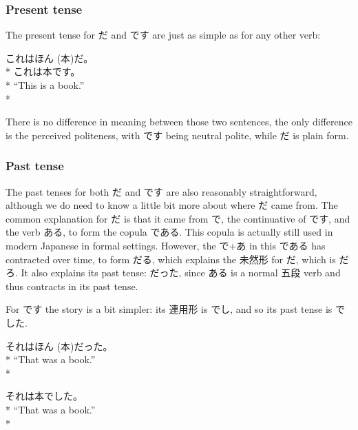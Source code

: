 \documentclass[11pt, b5paper, twoside, openright, onecolumn]{book}
\makeatletter
\newcommand*{\rubystack}[2]{{\relscale{0.5}%
  \begin{tabular}[b]{@{}c@{}}%
    {#1}\\%
   {\textscale{2}{#2}}%
  \end{tabular}}%
}
\DeclareRobustCommand*{\ruby}[2]{%
  \mbox{%
    \setlength{\parskip}{0ex}%
    \BeginAccSupp{method=pdfstringdef,ActualText={#1}}%
      \rubystack{\phantom{#2}}{#1}%
      \llap{%
        \rubystack{#2}{\phantom{#1}}%
      }%
    \EndAccSupp{}%
  }%
}
\renewcommand*{\ruby}[2]{#2 (#1)}%
\newenvironment{exampleblock}{
\setlength{\parindent}{0.6in}
\begin{minipage}[t]{\dimexpr\textwidth-\parindent}}
{\end{minipage}}
\makeatother
\begin{document}
\subsubsection{Present tense}

The present tense for だ and です are just as simple as for any other verb:

\vspace{0.4cm}
\begin{exampleblock}
これは\ruby{本}{ほん}だ。 \\* 
これは本です。 \\* 
“This is a book.” \\* 
\end{exampleblock}
\vspace{0.2cm}

There is no difference in meaning between those two sentences‚ the only difference is the perceived politeness‚ with です being neutral polite‚ while だ is plain form.

\subsubsection{Past tense}

The past tenses for both だ and です are also reasonably straightforward‚ although we do need to know a little bit more about where だ came from. The common explanation for だ is that it came from で‚ the continuative of です‚ and the verb ある‚ to form the copula である. This copula is actually still used in modern Japanese in formal settings. However‚ the で+あ in this である has contracted over time‚ to form だる‚ which explains the 未然形 for だ‚ which is だろ. It also explains its past tense: だった‚ since ある is a normal 五段 verb and thus contracts in its past tense.

For です the story is a bit simpler: its 連用形 is でし‚ and so its past tense is でした.

\vspace{0.4cm}
\begin{exampleblock}
それは\ruby{本}{ほん}だった。 \\* 
“That was a book.” \\* 
\end{exampleblock}
\vspace{0.2cm}

\begin{exampleblock}
それは本でした。 \\* 
“That was a book.” \\* 
\end{exampleblock}
\vspace{0.2cm}
\end{document}

